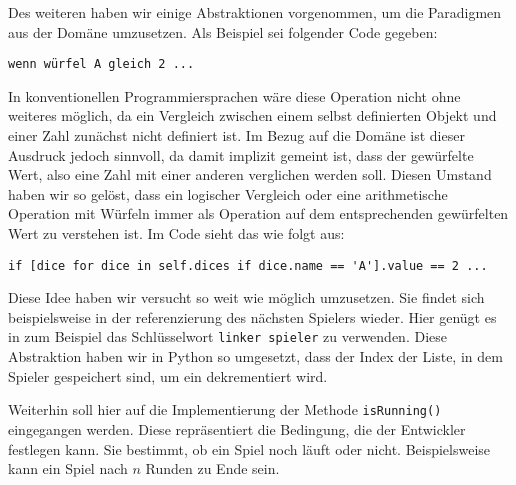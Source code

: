		Des weiteren haben wir einige Abstraktionen vorgenommen, um die Paradigmen aus der Domäne umzusetzen. Als Beispiel sei folgender Code gegeben:
\begin{lstlisting}
wenn würfel A gleich 2 ...
\end{lstlisting}
		In konventionellen Programmiersprachen wäre diese Operation nicht ohne weiteres möglich, da ein Vergleich zwischen einem selbst definierten Objekt und einer Zahl zunächst nicht definiert ist. Im Bezug auf die Domäne ist dieser Ausdruck jedoch sinnvoll, da damit implizit gemeint ist, dass der gewürfelte Wert, also eine Zahl mit einer anderen verglichen werden soll. Diesen Umstand haben wir so gelöst, dass ein logischer Vergleich oder eine arithmetische Operation mit Würfeln immer als Operation auf dem entsprechenden gewürfelten Wert zu verstehen ist. Im Code sieht das wie folgt aus:

\begin{lstlisting}
if [dice for dice in self.dices if dice.name == 'A'].value == 2 ...
\end{lstlisting}
Diese Idee haben wir versucht so weit wie möglich umzusetzen. Sie findet sich beispielsweise in der referenzierung des nächsten Spielers wieder. Hier genügt es in \dg zum Beispiel das Schlüsselwort \texttt{linker spieler} zu verwenden. Diese Abstraktion haben wir in Python so umgesetzt, dass der Index der Liste, in dem Spieler gespeichert sind, um ein dekrementiert wird.

Weiterhin soll hier auf die Implementierung der Methode \texttt{isRunning()} eingegangen werden. Diese repräsentiert die Bedingung, die der Entwickler festlegen kann. Sie bestimmt, ob ein Spiel noch läuft oder nicht. Beispielsweise kann ein Spiel nach $n$ Runden zu Ende sein.

